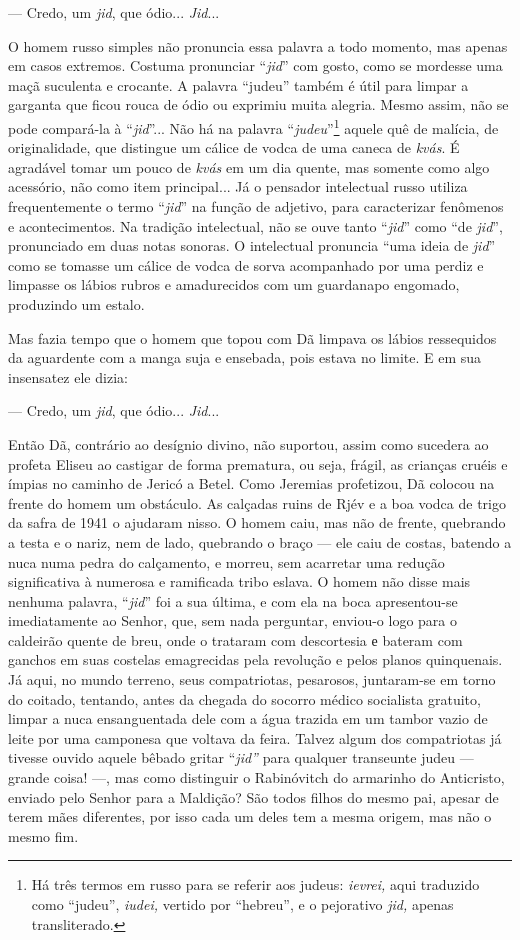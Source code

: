--- Credo, um \emph{jid}, que ódio... \emph{Jid}...

O homem russo simples não pronuncia essa palavra a todo momento, mas
apenas em casos extremos. Costuma pronunciar ``\emph{jid}'' com gosto,
como se mordesse uma maçã suculenta e crocante. A palavra ``judeu''
também é útil para limpar a garganta que ficou rouca de ódio ou exprimiu
muita alegria. Mesmo assim, não se pode compará-la à ``\emph{jid}''...
Não há na palavra ``\emph{judeu}''\footnote{Há três termos em russo para
  se referir aos judeus: \emph{ievrei,} aqui traduzido como ``judeu'',
  \emph{iudei,} vertido por ``hebreu'', e o pejorativo \emph{jid,}
  apenas transliterado.} aquele quê de malícia, de originalidade, que
distingue um cálice de vodca de uma caneca de \emph{kvás}. É agradável
tomar um pouco de \emph{kvás} em um dia quente, mas somente como algo
acessório, não como item principal... Já o pensador intelectual russo
utiliza frequentemente o termo ``\emph{jid}'' na função de adjetivo,
para caracterizar fenômenos e acontecimentos. Na tradição intelectual,
não se ouve tanto ``\emph{jid}'' como ``de \emph{jid}'', pronunciado em
duas notas sonoras. O intelectual pronuncia ``uma ideia de \emph{jid}''
como se tomasse um cálice de vodca de sorva acompanhado por uma perdiz e
limpasse os lábios rubros e amadurecidos com um guardanapo engomado,
produzindo um estalo.

Mas fazia tempo que o homem que topou com Dã limpava os lábios
ressequidos da aguardente com a manga suja e ensebada, pois estava no
limite. E em sua insensatez ele dizia:

--- Credo, um \emph{jid}, que ódio... \emph{Jid}...

Então Dã, contrário ao desígnio divino, não suportou, assim como
sucedera ao profeta Eliseu ao castigar de forma prematura, ou seja,
frágil, as crianças cruéis e ímpias no caminho de Jericó a Betel. Como
Jeremias profetizou, Dã colocou na frente do homem um obstáculo. As
calçadas ruins de Rjév e a boa vodca de trigo da safra de 1941 o
ajudaram nisso. O homem caiu, mas não de frente, quebrando a testa e o
nariz, nem de lado, quebrando o braço --- ele caiu de costas, batendo a
nuca numa pedra do calçamento, e morreu, sem acarretar uma redução
significativa à numerosa e ramificada tribo eslava. O homem não disse
mais nenhuma palavra, ``\emph{jid}'' foi a sua última, e com ela na boca
apresentou-se imediatamente ao Senhor, que, sem nada perguntar, enviou-o
logo para o caldeirão quente de breu, onde o trataram com descortesia е
bateram com ganchos em suas costelas emagrecidas pela revolução e pelos
planos quinquenais. Já aqui, no mundo terreno, seus compatriotas,
pesarosos, juntaram-se em torno do coitado, tentando, antes da chegada
do socorro médico socialista gratuito, limpar a nuca ensanguentada dele
com a água trazida em um tambor vazio de leite por uma camponesa que
voltava da feira. Talvez algum dos compatriotas já tivesse ouvido aquele
bêbado gritar ``\emph{jid''} para qualquer transeunte judeu --- grande
coisa! ---, mas como distinguir o Rabinóvitch do armarinho do
Anticristo, enviado pelo Senhor para a Maldição? São todos filhos do
mesmo pai, apesar de terem mães diferentes, por isso cada um deles tem a
mesma origem, mas não o mesmo fim.

